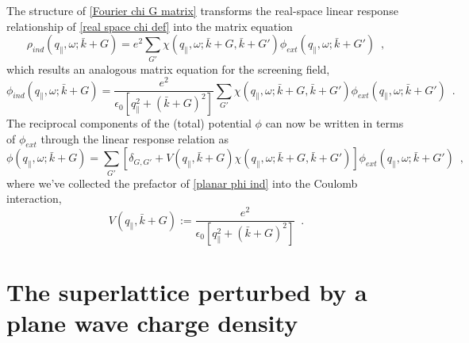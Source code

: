 \documentclass{article}
\newcommand{\lp}{\left(}
\newcommand{\lb}{\left[}
\newcommand{\rb}{\right]}
\newcommand{\rp}{\right)}
\newcommand{\e}{\epsilon}
\begin{document}
The structure of \eqref{Fourier chi G matrix} transforms the real-space linear response relationship of \eqref{real space chi def} into the matrix equation
\begin{equation}
    \label{planar linear response}
     \rho_{ind}(q_\parallel,\omega;\bar k+G) = e^2\sum_{G'}\chi(q_\parallel,\omega;\bar k+G, \bar k+G')
     \phi_{ext}(q_\parallel,\omega;\bar k+G')
     \,\,\,,
\end{equation}
which results an analogous matrix equation for the screening field,
\begin{equation}
    \label{planar phi ind}
     \phi_{ind}(q_\parallel,\omega;\bar k+G) = \frac{e^2}{\e_0\lb q_\parallel^2+\lp\bar k+G\rp^2\rb} \sum_{G'}\chi(q_\parallel,\omega;\bar k+G, \bar k+G')
     \phi_{ext}(q_\parallel,\omega;\bar k+G')
     \,\,\,.
\end{equation}
The reciprocal components of the (total) potential $\phi$ can now be written in terms of $\phi_{ext}$ through the linear response relation as
\begin{equation}
    \label{planar phi to phi ext relation}
    \phi(q_\parallel,\omega;\bar k+G) 
    =
    \sum_{G'}
    \lb
    \delta_{G,G'}
    +
    V(q_\parallel,\bar k+G)
    \chi(q_\parallel,\omega;\bar k+G, \bar k+G')
    \rb
    \phi_{ext}(q_\parallel,\omega;\bar k+ G')
    \,\,\,,
\end{equation}
where we've collected the prefactor of \eqref{planar phi ind} into the Coulomb interaction,
\begin{equation}
    \label{V def}
    V(q_\parallel,\bar k+G):=
    \frac{e^2}{\e_0\lb q_\parallel^2+\lp\bar k+G\rp^2\rb}
    \,\,\,.
\end{equation}
































\section{The superlattice perturbed by a plane wave charge density}
\end{document}
